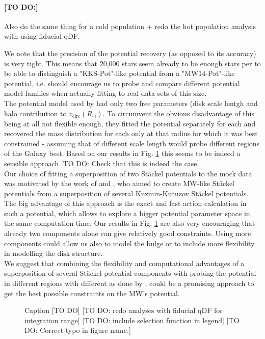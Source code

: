 \paragraph{[TO DO:]} Also do the same thing for a cold population + redo the hot population analysis with using fiducial qDF.





We note that the precision of the potential recovery (as opposed to its accuracy) is very tight. This means that 20,000 stars seem already to be enough stars per \MAP to be able to distinguish a "KKS-Pot"-like potential from a "MW14-Pot"-like potential, i.e. should encourage us to probe and compare different potential model families when actually fitting to real data sets of this size.
\\The potential model used by \citet{bov13} had only two free parameters (disk scale lentgh and halo contribution to $v_\text{circ}(R_\odot)$. To circumvent the obvious disadvantage of this being at all not flexible enough, they fitted the potential separately for each \MAP and recovered the mass distribution for each \MAP only at that radius for which it was best constrained - assuming that \MAPs of different scale length would probe different regions of the Galaxy best. Based on our results in Fig. \ref{fig:MW14vsKKS2SphFlex} this seems to be indeed a sensible approach [TO DO: Check that this is indeed the case].
\\Our choice of fitting a superposition of two St\"{a}ckel potentials to the mock data was motivated by the work of \citet{bat94} and \citet{fam03}, who aimed to create MW-like St\"{a}ckel potentials from a superposition of several Kuzmin-Kutuzov St\"{a}ckel potentials. The big advantage of this approach is the exact and fast action calculation in such a potential, which allows to explore a bigger potential parameter space in the same computation time. Our results in Fig. \ref{fig:MW14vsKKS2SphFlex} are also very encouraging that already two components alone can give relatively good constraints. Using more components could allow us also to model the bulge or to include more flexibility in modelling the disk structure.
\\We suggest that combining the flexibility and computational advantages of a superposition of several St\"{a}ckel potential components with probing the potential in different regions with different \MAPs as done by \citet{bov13}, could be a promising approach to get the best possible constraints on the MW's potential.




\begin{figure}
\caption{Caption [TO DO] [TO DO: redo analyses with fiducial qDF for integration range] [TO DO: include selection function in legend] [TO DO: Correct typo in figure name.]}
\label{fig:MW14vsKKS2SphFlex}
\end{figure}





